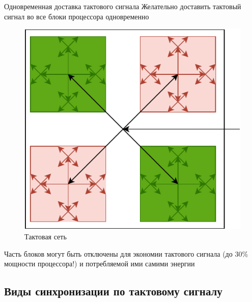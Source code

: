 \documentclass[xetex,aspectratio=43]{beamer}
\begin{document}
\begin{frame}{Одновременная доставка тактового сигнала}
    Желательно доставить тактовый сигнал во все блоки процессора одновременно
    \begin{figure}
        \includegraphics[height=0.6\textheight,page=1]{img/05.clocks.drawio-crop.pdf}
        \caption{Тактовая сеть}
    \end{figure}
    \pause
    Часть блоков могут быть отключены для экономии тактового сигнала (до 30\% мощности процессора!)
    и потребляемой ими самими энергии
\end{frame}

\subsection{Виды синхронизации по тактовому сигналу}
\end{document}
